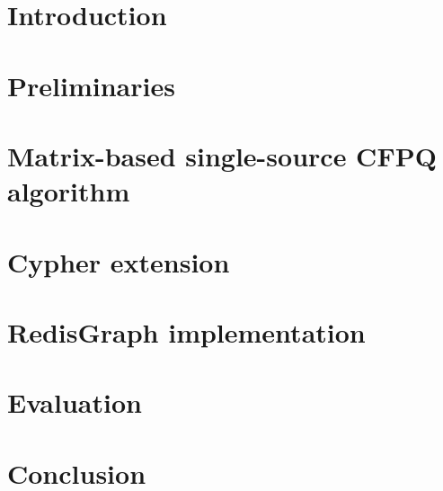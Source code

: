 \section{Introduction}

\section{Preliminaries}

\section{Matrix-based single-source CFPQ algorithm}

\section{Cypher extension}

\section{RedisGraph implementation}

\section{Evaluation}

\section{Conclusion}
